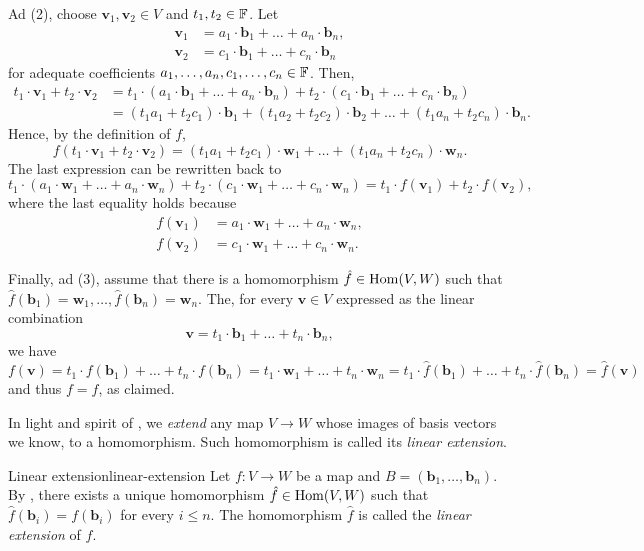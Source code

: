 \begin{thmproof}
 Ad (2), choose $\mathbf{v}_1,\mathbf{v}_2 \in V$ and $t_1,t_2 \in \mathbb{F}$. Let
 \begin{align*}
  \mathbf{v}_1 &= a_1 \cdot \mathbf{b}_1 + \ldots + a_n \cdot \mathbf{b}_n,\\
  \mathbf{v}_2 &= c_1 \cdot \mathbf{b}_1 + \ldots + c_n \cdot \mathbf{b}_n
 \end{align*}
 for adequate coefficients $a_1,\ldots,a_n,c_1,\ldots,c_n \in \mathbb{F}$. Then,
 \begin{align*}
  t_1 \cdot \mathbf{v}_1 + t_2 \cdot \mathbf{v}_2 
  &= t_1 \cdot (a_1 \cdot \mathbf{b}_1 + \ldots + a_n \cdot \mathbf{b}_n) + t_2
  \cdot (c_1 \cdot \mathbf{b}_1 + \ldots + c_n \cdot \mathbf{b}_n)\\
  &=(t_1a_1 + t_2c_1) \cdot \mathbf{b}_1 + (t_1a_2 + t_2c_2) \cdot \mathbf{b}_2
  + \ldots + (t_1a_n + t_2c_n) \cdot \mathbf{b}_n.
 \end{align*}
 Hence, by the definition of $f$,
 \[
  f(t_1 \cdot \mathbf{v}_1 + t_2 \cdot \mathbf{v}_2) = (t_1a_1 + t_2c_1) \cdot
  \mathbf{w}_1 + \ldots + (t_1a_n + t_2c_n) \cdot \mathbf{w}_n.
 \]
 The last expression can be rewritten back to
 \[
  t_1 \cdot (a_1 \cdot \mathbf{w}_1 + \ldots + a_n \cdot \mathbf{w}_n) + t_2
  \cdot (c_1 \cdot \mathbf{w}_1 + \ldots + c_n \cdot \mathbf{w}_n) = t_1 \cdot
  f(\mathbf{v}_1) + t_2 \cdot f(\mathbf{v}_2),
 \]
 where the last equality holds because
 \begin{align*}
  f(\mathbf{v}_1) &= a_1 \cdot \mathbf{w}_1 + \ldots + a_n \cdot \mathbf{w}_n,\\
  f(\mathbf{v}_2) &= c_1 \cdot \mathbf{w}_1 + \ldots + c_n \cdot \mathbf{w}_n.
 \end{align*}

 Finally, ad (3), assume that there is a homomorphism $\hat{f} \in \operatorname{Hom}(V,W)$
 such that $\hat{f}(\mathbf{b}_1) = \mathbf{w}_1, \ldots, \hat{f}(\mathbf{b}_n)
 = \mathbf{w}_n$. The, for every $\mathbf{v} \in V$ expressed as the linear
 combination
 \[
  \mathbf{v} = t_1 \cdot \mathbf{b}_1 + \ldots + t_n \cdot \mathbf{b}_n,
 \]
 we have
 \[
  f(\mathbf{v}) = t_1 \cdot f(\mathbf{b}_1) + \ldots + t_n \cdot f(\mathbf{b}_n)
  = t_1 \cdot \mathbf{w}_1 + \ldots + t_n \cdot \mathbf{w}_n = t_1 \cdot
  \hat{f}(\mathbf{b}_1) + \ldots + t_n \cdot \hat{f}(\mathbf{b}_n) =
  \hat{f}(\mathbf{v})
 \]
 and thus $f = \hat{f}$, as claimed.
\end{thmproof}

In light and spirit of , we \emph{extend} any
map $V \to W$ whose images of basis vectors we know, to a homomorphism. Such
homomorphism is called its \emph{linear extension}.

\begin{definition}{Linear extension}{linear-extension}
 Let $f:V \to W$ be a map and $B = (\mathbf{b}_1,\ldots,\mathbf{b}_n)$. By
 , there exists a unique homomorphism
 $\hat{f} \in \operatorname{Hom}(V,W)$ such that $\hat{f}(\mathbf{b}_i) = f(\mathbf{b}_i)$ for
 every $i \leq n$. The homomorphism $\hat{f}$ is called the \emph{linear
 extension} of $f$.
\end{definition}



